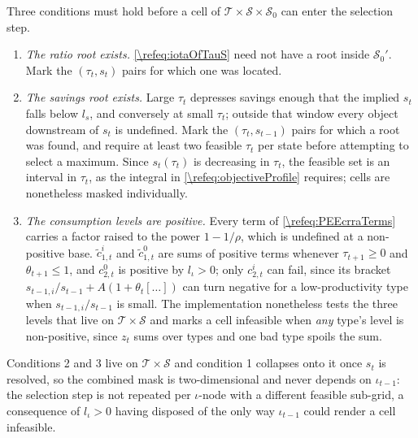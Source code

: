 Three conditions must hold before a cell of $\mathcal{T}\times\mathcal{S}\times\mathcal{S}_0$ can enter the selection step.
\begin{enumerate}
    \item \emph{The ratio root exists.} \eqref{\refeq:iotaOfTauS} need not have a root inside $\mathcal{S}_0'$. Mark the $(\tau_t,s_t)$ pairs for which one was located.
    \item \emph{The savings root exists.} Large $\tau_t$ depresses savings enough that the implied $s_t$ falls below $l_s$, and conversely at small $\tau_t$; outside that window every object downstream of $s_t$ is undefined. Mark the $(\tau_t,s_{t-1})$ pairs for which a root was found, and require at least two feasible $\tau_t$ per state before attempting to select a maximum. Since $s_t(\tau_t)$ is decreasing in $\tau_t$, the feasible set is an interval in $\tau_t$, as the integral in \eqref{\refeq:objectiveProfile} requires; cells are nonetheless masked individually.
    \item \emph{The consumption levels are positive.} Every term of \eqref{\refeq:PEEcrraTerms} carries a factor raised to the power $1-1/\rho$, which is undefined at a non-positive base. $\tilde{c}_{1,t}^i$ and $\tilde{c}_{1,t}^0$ are sums of positive terms whenever $\tau_{t+1}\geq 0$ and $\theta_{t+1}\leq 1$, and $c_{2,t}^0$ is positive by $l_{\iota}>0$; only $c_{2,t}^i$ can fail, since its bracket $s_{t-1,i}/s_{t-1}+A\left(1+\theta_t\left[\ldots\right]\right)$ can turn negative for a low-productivity type when $s_{t-1,i}/s_{t-1}$ is small. The implementation nonetheless tests the three levels that live on $\mathcal{T}\times\mathcal{S}$ and marks a cell infeasible when \emph{any} type's level is non-positive, since $z_t$ sums over types and one bad type spoils the sum.
\end{enumerate}
Conditions 2 and 3 live on $\mathcal{T}\times\mathcal{S}$ and condition 1 collapses onto it once $s_t$ is resolved, so the combined mask is two-dimensional and never depends on $\iota_{t-1}$: the selection step is not repeated per $\iota$-node with a different feasible sub-grid, a consequence of $l_{\iota}>0$ having disposed of the only way $\iota_{t-1}$ could render a cell infeasible.

